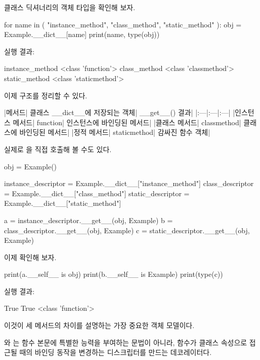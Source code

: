 클래스 딕셔너리의 객체 타입을 확인해 보자.

\begin{dhkcode}
for name in (
    "instance_method",
    "class_method",
    "static_method"
):
    obj = Example.__dict__[name]
    print(name, type(obj))
\end{dhkcode}

실행 결과:

\begin{dhkzsh}
instance_method <class 'function'>
class_method <class 'classmethod'>
static_method <class 'staticmethod'>
\end{dhkzsh}

이제 구조를 정리할 수 있다.

\begin{dhktable}
|메서드|	클래스 __dict__에 저장되는 객체|	__get__() 결과|
|:---|:---|:---|
|인스턴스 메서드|	function|	인스턴스에 바인딩된 메서드|
|클래스 메서드|	classmethod|	클래스에 바인딩된 메서드|
|정적 메서드|	staticmethod|	감싸진 함수 객체|
\end{dhktable}

실제로 을 직접 호출해 볼 수도 있다.

\begin{dhkcode}
obj = Example()

instance_descriptor = Example.__dict__["instance_method"]
class_descriptor = Example.__dict__["class_method"]
static_descriptor = Example.__dict__["static_method"]


a = instance_descriptor.__get__(obj, Example)
b = class_descriptor.__get__(obj, Example)
c = static_descriptor.__get__(obj, Example)
\end{dhkcode}

이제 확인해 보자.

\begin{dhkcode}
print(a.__self__ is obj)
print(b.__self__ is Example)
print(type(c))
\end{dhkcode}

실행 결과:

\begin{dhkzsh}
True
True
<class 'function'>
\end{dhkzsh}

이것이 세 메서드의 차이를 설명하는 가장 중요한 객체 모델이다.

와 는 함수 본문에 특별한 능력을 부여하는 문법이 아니라, 함수가 클래스 속성으로 접근될 때의 바인딩 동작을 변경하는 디스크립터를 만드는 데코레이터다.


